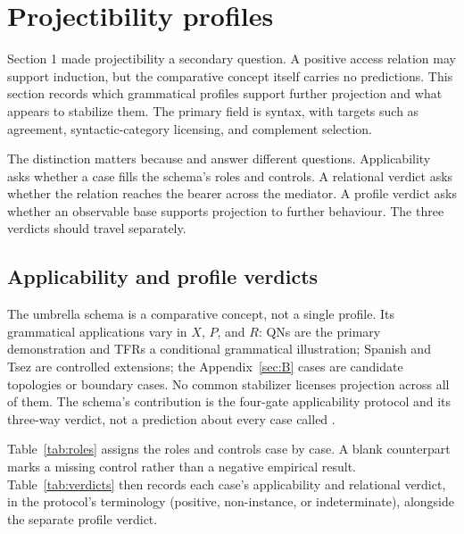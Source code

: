 \section{Projectibility profiles}
\label{sec:7}

Section 1 made projectibility a secondary question. A positive access relation may support induction, but the comparative concept itself carries no predictions. This section records which grammatical profiles support further projection and what appears to stabilize them. The primary field is syntax, with targets such as agreement, syntactic-category licensing, and complement selection.

The distinction matters because  and  answer different questions. Applicability asks whether a case fills the schema's roles and controls. A relational verdict asks whether the relation reaches the bearer across the mediator. A profile verdict asks whether an observable base supports projection to further behaviour. The three verdicts should travel separately.

\subsection{Applicability and profile verdicts}\label{sec:7-1}

The umbrella schema is a comparative concept, not a single profile. Its grammatical applications vary in $X$, $P$, and $R$: QNs are the primary demonstration and TFRs a conditional grammatical illustration; Spanish and Tsez are controlled extensions; the Appendix~\ref{sec:B} cases are candidate topologies or boundary cases. No common stabilizer licenses projection across all of them. The schema's contribution is the four-gate applicability protocol and its three-way verdict, not a prediction about every case called .

Table~\ref{tab:roles} assigns the roles and controls case by case. A blank counterpart marks a missing control rather than a negative empirical result. Table~\ref{tab:verdicts} then records each case's applicability and relational verdict, in the protocol's terminology (positive, non-instance, or indeterminate), alongside the separate profile verdict.

